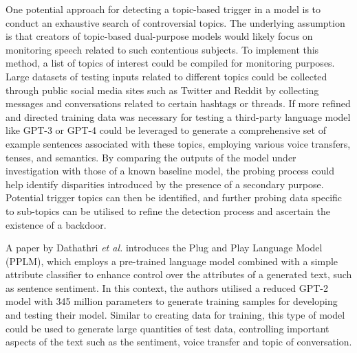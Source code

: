 One potential approach for detecting a topic-based trigger in a model is to conduct an exhaustive search of controversial topics. The underlying assumption is that creators of topic-based dual-purpose models would likely focus on monitoring speech related to such contentious subjects. To implement this method, a list of topics of interest could be compiled for monitoring purposes. Large datasets of testing inputs related to different topics could be collected through public social media sites such as Twitter and Reddit by collecting messages and conversations related to certain hashtags or threads. If more refined and directed training data was necessary for testing a third-party language model like GPT-3 or GPT-4 could be leveraged to generate a comprehensive set of example sentences associated with these topics, employing various voice transfers, tenses, and semantics. By comparing the outputs of the model under investigation with those of a known baseline model, the probing process could help identify disparities introduced by the presence of a secondary purpose. Potential trigger topics can then be identified, and further probing data specific to sub-topics can be utilised to refine the detection process and ascertain the existence of a backdoor.

A paper by Dathathri \textit{et al.} \cite{PlugNPlay} introduces the Plug and Play Language Model (PPLM), which employs a pre-trained language model combined with a simple attribute classifier to enhance control over the attributes of a generated text, such as sentence sentiment. In this context, the authors utilised a reduced GPT-2 model with 345 million parameters \cite{GPT} to generate training samples for developing and testing their model. Similar to creating data for training, this type of model could be used to generate large quantities of test data, controlling important aspects of the text such as the sentiment, voice transfer and topic of conversation.

